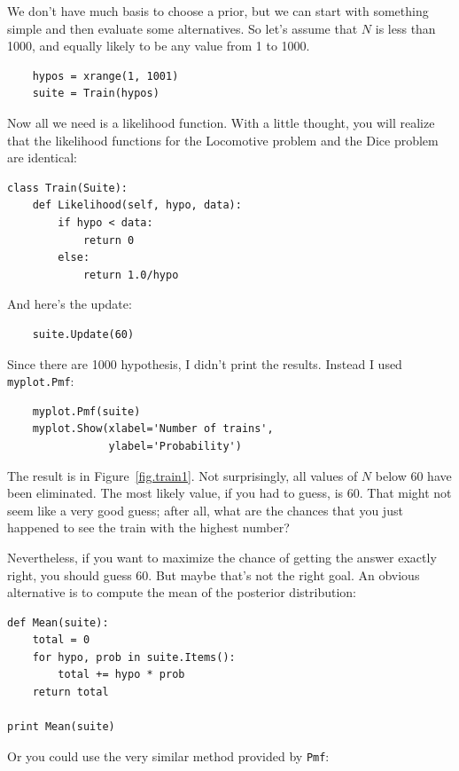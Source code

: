 \documentclass[12pt]{book}
\begin{document}
We don't have much basis to choose a prior, but we can
start with something simple and
then evaluate some alternatives.  So let's assume that $N$ is less
than 1000, and equally likely to be any value from 1 to 1000.

\begin{verbatim}
    hypos = xrange(1, 1001)
    suite = Train(hypos)
\end{verbatim}

Now all we need is a likelihood function.  With a little thought,
you will realize that the likelihood functions for the Locomotive
problem and the Dice problem are identical:

\begin{verbatim}
class Train(Suite):
    def Likelihood(self, hypo, data):
        if hypo < data:
            return 0
        else:
            return 1.0/hypo
\end{verbatim}

And here's the update:

\begin{verbatim}
    suite.Update(60)
\end{verbatim}

Since there are 1000 hypothesis, I didn't print the results.
Instead I used {\tt myplot.Pmf}:

\begin{verbatim}
    myplot.Pmf(suite)
    myplot.Show(xlabel='Number of trains',
                ylabel='Probability')
\end{verbatim}

The result is in Figure~\ref{fig.train1}.  Not surprisingly, all
values of $N$ below 60 have been eliminated.  The most likely
value, if you had to guess, is 60.  That might not seem like
a very good guess; after all, what are the chances that you just
happened to see the train with the highest number?

Nevertheless, if you want to maximize the chance of getting
the answer exactly right, you should guess 60.  But maybe that's
not the right goal.  An obvious alternative is to compute the
mean of the posterior distribution:

\begin{verbatim}
def Mean(suite):
    total = 0
    for hypo, prob in suite.Items():
        total += hypo * prob
    return total

print Mean(suite)
\end{verbatim}

Or you could use the very similar method provided by {\tt Pmf}:
\end{document}
